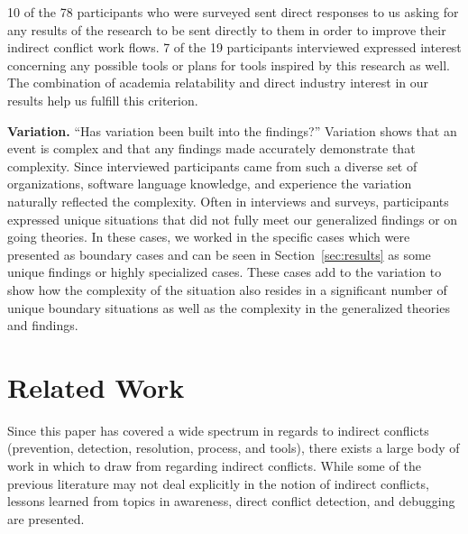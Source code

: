 \documentclass[conference]{IEEEtran}
\begin{document}
10 of the 78 participants who were surveyed sent direct responses to us asking for any results of the research to be sent directly to
them in order to improve their indirect conflict work flows. 7 of the 19 participants interviewed expressed interest concerning any possible
tools or plans for tools inspired by this research as well. The combination of academia relatability and direct industry interest 
in our results help us fulfill this criterion.

{\bfseries Variation.} ``Has variation been built into the findings?'' Variation shows that an event is complex and that any findings
made accurately demonstrate that complexity. Since interviewed participants came from such a diverse set of organizations, 
software language knowledge, and experience the variation naturally reflected the complexity. Often in interviews and surveys, participants
expressed unique situations that did not fully meet our generalized findings or on going theories. In these cases, we worked in the specific
cases which were presented as boundary cases and can be seen in Section~\ref{sec:results} as some unique findings or highly
specialized cases. These cases add to the variation
to show how the complexity of the situation also resides in a significant number of unique boundary situations as well as the complexity
in the generalized theories and findings.

\section{Related Work}
\label{sec:related}

Since this paper has covered a wide spectrum in regards to indirect conflicts (prevention, detection, resolution, process, and tools), there
exists a large body of work in which to draw from regarding indirect conflicts. While some of the previous literature may not deal explicitly
in the notion of indirect conflicts, lessons learned from topics in awareness, direct conflict detection, and debugging are presented.
\end{document}
